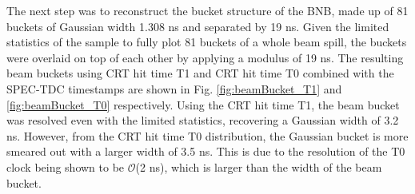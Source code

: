 
The next step was to reconstruct the bucket structure of the BNB, made up of 81 buckets of Gaussian width 1.308 ns and separated by 19 ns.
Given the limited statistics of the sample to fully plot 81 buckets of a whole beam spill, the buckets were overlaid on top of each other by applying a modulus of 19 ns.
The resulting beam buckets using CRT hit time T1 and CRT hit time T0 combined with the SPEC-TDC timestamps are shown in Fig. \ref{fig:beamBucket_T1} and \ref{fig:beamBucket_T0} respectively.
Using the CRT hit time T1, the beam bucket was resolved even with the limited statistics, recovering a Gaussian width of 3.2 ns.
However, from the CRT hit time T0 distribution, the Gaussian bucket is more smeared out with a larger width of 3.5 ns. 
This is due to the resolution of the T0 clock being shown to be $\mathcal{O}$(2 ns), which is larger than the width of the beam bucket.

